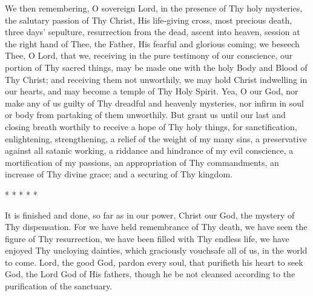 We then remembering, O sovereign Lord, in the presence of Thy holy mysteries, the salutary passion of Thy Christ, His life‑giving cross, most precious death, three days’ sepulture, resurrection from the dead, ascent into heaven, session at the right hand of Thee, the Father, His fearful and glorious coming; we beseech Thee, O Lord, that we, receiving in the pure testimony of our conscience,  our portion of Thy sacred things, may be made one with the holy Body and Blood of Thy Christ; and receiving them not unworthily, we may hold Christ indwelling in our hearts, and may become a temple of Thy Holy Spirit. Yea, O our God, nor make any of us guilty of Thy dreadful and heavenly mysteries, nor infirm in soul or body from partaking of them unworthily. But grant us until our last and closing breath worthily to receive a hope of Thy holy things, for sanctification, enlightening, strengthening, a relief of the weight of my many sins, a preservative against all satanic working, a riddance and hindrance of my evil conscience, a mortification of my passions, an appropriation of Thy commandments, an increase of Thy divine grace; and a securing of Thy kingdom.

* * * * *

It is finished and done, so far as in our power, Christ our God, the mystery of Thy dispensation. For we have held remembrance of Thy death, we have seen the figure of Thy resurrection, we have been filled with Thy endless life, we have enjoyed Thy uncloying dainties, which graciously vouchsafe all of us, in the world to come. Lord, the good God, pardon every soul, that purifieth his heart to seek God, the Lord God of His fathers, though he be not cleansed according to the purification of the sanctuary.

